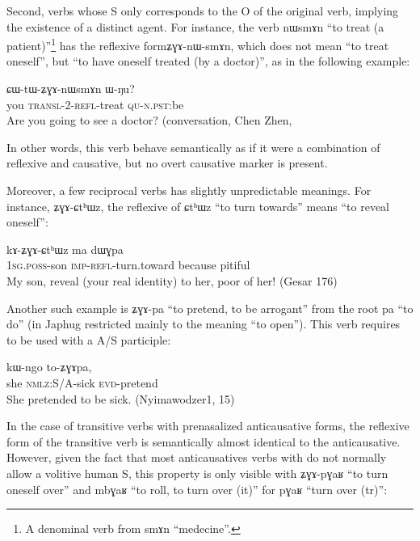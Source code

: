 \documentclass[oldfontcommands,oneside,a4paper,11pt]{memoir}
\newcommand{\ipa}[1]{{\phon #1}} %
\newcommand{\wav}[1]{}%
\newcommand{\evd}{\textsc{evd}}
\newcommand{\imp}{\textsc{imp}}
\newcommand{\nmlz}{\textsc{nmlz}}
\newcommand{\npst}{\textsc{n.pst}}
\newcommand{\poss}{\textsc{poss}}
\newcommand{\qu}{\textsc{qu}}
\newcommand{\refl}{\textsc{refl}}
\newcommand{\sg}{\textsc{sg}}
\newcommand{\transloc}{\textsc{transl}}
\begin{document}
Second, verbs whose S only corresponds to the O of the original verb, implying the existence of a distinct agent. For instance, the verb  \ipa{nɯsmɤn} ``to treat (a patient)''\footnote{A denominal verb from \ipa{smɤn} ``medecine''.} has the reflexive form\ipa{ʑɣɤ-nɯ-smɤn}, which does not mean ``to treat oneself'', but ``to have oneself treated (by a doctor)'', as in the following example:
   \begin{exe}
\ex
\gll  \ipa{nɤʑo} 	\ipa{ɕɯ-tɯ-ʑɣɤ-nɯsmɤn} 	\ipa{ɯ-ŋu?}   \\
you \transloc{}-2-\refl{}-treat \qu{}-\npst{}:be     \\
  \glt Are you going to see a doctor? (conversation, Chen Zhen, \wav{8_ZGAnWsmAn}
   \end{exe}
In other words, this verb behave semantically as if it were a combination of reflexive and causative, but no overt causative marker is present.

Moreover, a few reciprocal verbs has slightly unpredictable meanings. For instance, \ipa{ʑɣɤ-ɕtʰɯz}, the reflexive of \ipa{ɕtʰɯz} 	``to turn towards'' means   ``to reveal oneself'': 

   \begin{exe}
\ex
\gll  \ipa{a-tɕɯ}	\ipa{kɤ-ʑɣɤ-ɕtʰɯz}	\ipa{ma}	\ipa{dɯɣpa}  \\
    1\sg{}.\poss{}-son \imp{}-\refl{}-turn.toward because pitiful\\
  \glt My son, reveal (your real identity) to her, poor of her!  (Gesar 176)
   \end{exe}
Another such example is \ipa{ʑɣɤ-pa} ``to pretend, to be arrogant'' from the root \ipa{pa} ``to do'' (in Japhug restricted mainly to the meaning ``to open''). This verb requires to be used with a A/S participle:
   \begin{exe}
\ex
\gll  \ipa{ɯʑo} 	\ipa{kɯ-ngo} 	\ipa{to-ʑɣɤpa,} \\
     she \nmlz{}:S/A-sick \evd{}-pretend \\
  \glt She pretended to be sick. (Nyimawodzer1, 15)
   \end{exe}

In the case of transitive verbs with prenasalized anticausative forms, the reflexive form of the transitive verb is semantically almost identical to the anticausative. However, given the fact that most anticausatives verbs with do not normally allow a volitive human S, this property is only visible with \ipa{ʑɣɤ-pɣaʁ} ``to turn oneself over'' and \ipa{mbɣaʁ} ``to roll, to turn over (it)'' for \ipa{pɣaʁ} ``turn over (tr)'':
\end{document}
